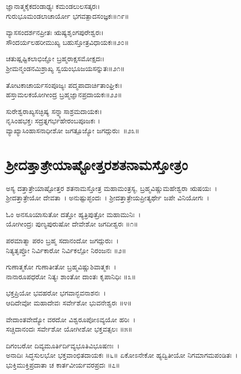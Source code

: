 ಜ್ಞಾನಾತ್ಮಕೈಕದಂಡಾಢ್ಯಃ ಕಮಂಡಲುಲಸತ್ಕರಃ।\\
ಗುರುಭೂಮಂಡಲಾಚಾರ್ಯೋ ಭಗವತ್ಪಾದಸಂಜ್ಞಕಃ॥೧೯॥

ವ್ಯಾಸಸಂದರ್ಶನಪ್ರೀತಃ ಋಷ್ಯಶೃಂಗಪುರೇಶ್ವರಃ।\\
ಸೌಂದರ್ಯಲಹರೀಮುಖ್ಯ ಬಹುಸ್ತೋತ್ರವಿಧಾಯಕಃ॥೨೦॥

ಚತುಷ್ಷಷ್ಟಿಕಲಾಭಿಜ್ಞೋ ಬ್ರಹ್ಮರಾಕ್ಷಸಮೋಕ್ಷದಃ।\\
 ಶ್ರೀಮನ್ಮಂಡನಮಿಶ್ರಾಖ್ಯ ಸ್ವಯಂಭೂಜಯಸನ್ನುತಃ॥೨೧॥

 ತೋಟಕಾಚಾರ್ಯಸಂಪೂಜ್ಯಃ  ಪದ್ಮಪಾದಾರ್ಚಿತಾಂಘ್ರಿಕಃ।\\
 ಹಸ್ತಾಮಲಕಯೋಗೀಂದ್ರ ಬ್ರಹ್ಮಜ್ಞಾನಪ್ರದಾಯಕಃ॥೨೨॥

 ಸುರೇಶ್ವರಾಖ್ಯಸಚ್ಛಿಷ್ಯ ಸನ್ನ್ಯಾಸಾಶ್ರಮದಾಯಕಃ।\\
 ನೃಸಿಂಹಭಕ್ತಃ  ಸದ್ರತ್ನಗರ್ಭಹೇರಂಬಪೂಜಕಃ ।\\
 ವ್ಯಾಖ್ಯಾಸಿಂಹಾಸನಾಧೀಶೋ ಜಗತ್ಪೂಜ್ಯೋ ಜಗದ್ಗುರುಃ~॥೨೩॥
\section{ಶ್ರೀದತ್ತಾತ್ರೇಯಾಷ್ಟೋತ್ತರಶತನಾಮಸ್ತೋತ್ರಂ}
ಅಸ್ಯ ದತ್ತಾತ್ರೇಯಾಷ್ಟೋತ್ತರ ಶತನಾಮಸ್ತೋತ್ರ ಮಹಾಮಂತ್ರಸ್ಯ, ಬ್ರಹ್ಮವಿಷ್ಣುಮಹೇಶ್ವರಾ ಋಷಯಃ~। ಶ್ರೀದತ್ತಾತ್ರೇಯೋ ದೇವತಾ~। ಅನುಷ್ಟುಪ್ಛಂದಃ~। ಶ್ರೀದತ್ತಾತ್ರೇಯಪ್ರೀತ್ಯರ್ಥೇ ಜಪೇ ವಿನಿಯೋಗಃ~।


ಓಂ ಅನಸೂಯಾಸುತೋ ದತ್ತೋ ಹ್ಯತ್ರಿಪುತ್ರೋ ಮಹಾಮುನಿಃ~।\\
ಯೋಗೀಂದ್ರಃ ಪುಣ್ಯಪುರುಷೋ ದೇವೇಶೋ ಜಗದೀಶ್ವರಃ ॥೧॥

ಪರಮಾತ್ಮಾ ಪರಂ ಬ್ರಹ್ಮ ಸದಾನಂದೋ ಜಗದ್ಗುರುಃ~।\\
ನಿತ್ಯತೃಪ್ತೋ ನಿರ್ವಿಕಾರೋ ನಿರ್ವಿಕಲ್ಪೋ ನಿರಂಜನಃ ॥೨॥

ಗುಣಾತ್ಮಕೋ ಗುಣಾತೀತೋ ಬ್ರಹ್ಮವಿಷ್ಣುಶಿವಾತ್ಮಕಃ~।\\
ನಾನಾರೂಪಧರೋ ನಿತ್ಯಃ ಶಾಂತೋ ದಾಂತಃ ಕೃಪಾನಿಧಿಃ ॥೩॥

ಭಕ್ತಪ್ರಿಯೋ ಭವಹರೋ ಭಗವಾನ್ಭವನಾಶನಃ~।\\
ಆದಿದೇವೋ ಮಹಾದೇವಃ ಸರ್ವೇಶೋ ಭುವನೇಶ್ವರಃ ॥೪॥

ವೇದಾಂತವೇದ್ಯೋ ವರದೋ ವಿಶ್ವರೂಪೋಽವ್ಯಯೋ ಹರಿಃ~।\\
ಸಚ್ಚಿದಾನಂದಃ ಸರ್ವೇಶೋ ಯೋಗೀಶೋ ಭಕ್ತವತ್ಸಲಃ ॥೫॥

ದಿಗಂಬರೋ ದಿವ್ಯಮೂರ್ತಿರ್ದಿವ್ಯಭೂತಿವಿಭೂಷಣಃ~।\\
ಅನಾದಿಃ ಸಿದ್ಧಸುಲಭೋ ಭಕ್ತವಾಂಛಿತದಾಯಕಃ ॥೬॥
\newpage
ಏಕೋಽನೇಕೋ ಹ್ಯದ್ವಿತೀಯೋ ನಿಗಮಾಗಮಪಂಡಿತಃ~।\\
ಭುಕ್ತಿಮುಕ್ತಿಪ್ರದಾತಾ ಚ ಕಾರ್ತವೀರ್ಯವರಪ್ರದಃ ॥೭॥


